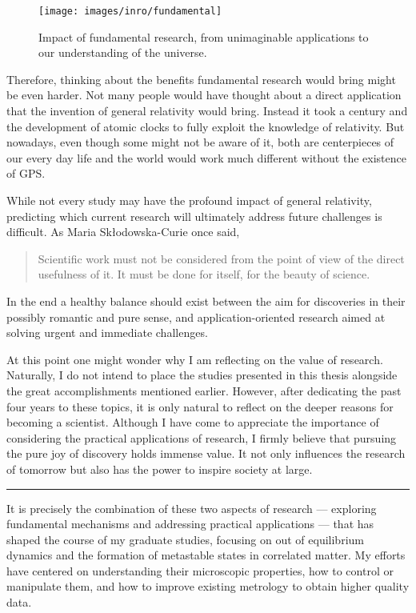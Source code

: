 \begin{figure}
	\centering
	\texttt{[image: images/inro/fundamental]}
	\caption{Impact of fundamental research, from unimaginable applications to our understanding of the universe.}
	\label{fig:fundamental}
\end{figure}


Therefore, thinking about the benefits fundamental research would bring might be even harder.
Not many people would have thought about a direct application that the invention of general relativity would bring.
Instead it took a century and the development of atomic clocks to fully exploit the knowledge of relativity.
But nowadays, even though some might not be aware of it, both are centerpieces of our every day life and the world would work much different without the existence of GPS.

While not every study may have the profound impact of general relativity, predicting which current research will ultimately address future challenges is difficult.
As Maria Skłodowska-Curie once said,
\begin{quote} 
	\centering 
	 Scientific work must not be considered from the point of view of the direct usefulness of it. It must be done for itself, for the beauty of science.
\end{quote}
In the end a healthy balance should exist between the aim for discoveries in their possibly romantic and pure sense, and application-oriented research aimed at solving urgent and immediate challenges.

At this point one might wonder why I am reflecting on the value of research.
Naturally, I do not intend to place the studies presented in this thesis alongside the great accomplishments mentioned earlier.
However, after dedicating the past four years to these topics, it is only natural to reflect on the deeper reasons for becoming a scientist.
Although I have come to appreciate the importance of considering the practical applications of research, I firmly believe that pursuing the pure joy of discovery holds immense value.
It not only influences the research of tomorrow but also has the power to inspire society at large.

\begin{center}
	\rule{0.3\textwidth}{.8pt}
\end{center}

It is precisely the combination of these two aspects of research — exploring fundamental mechanisms and addressing practical applications — that has shaped the course of my graduate studies, focusing on out of equilibrium dynamics and the formation of metastable states in correlated matter.
My efforts have centered on understanding their microscopic properties, how to control or manipulate them, and how to improve existing metrology to obtain higher quality data.

